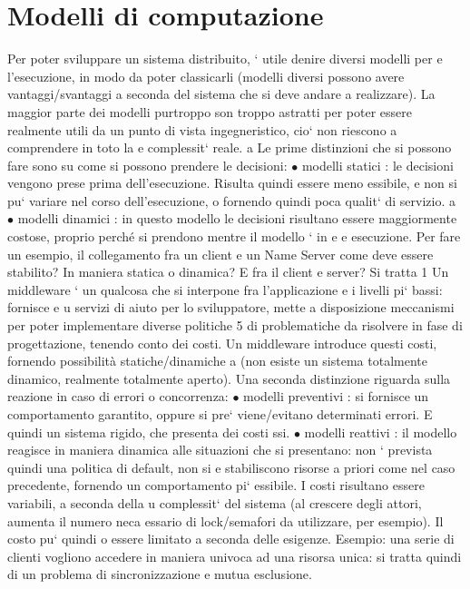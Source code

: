 \documentclass[a4paper,12pt]{article}
\begin{document}
\section{Modelli di computazione}
Per poter sviluppare un sistema distribuito, ` utile denire diversi modelli per
e
l'esecuzione, in modo da poter classicarli (modelli diversi possono avere vantaggi/svantaggi a seconda del sistema che si deve andare a realizzare). La maggior
parte dei modelli purtroppo son troppo astratti per poter essere realmente utili
da un punto di vista ingegneristico, cio` non riescono a comprendere in toto la
e
complessit` reale.
a
Le prime distinzioni che si possono fare sono su come si possono prendere le
decisioni:
$\bullet$ modelli statici : le decisioni vengono prese prima dell'esecuzione. Risulta
quindi essere meno essibile, e non si pu` variare nel corso dell'esecuzione,
o
fornendo quindi poca qualit` di servizio.
a
$\bullet$ modelli dinamici : in questo modello le decisioni risultano essere maggiormente costose, proprio perché si
prendono mentre il modello ` in
e
e
esecuzione.
Per fare un esempio, il collegamento fra un client e un Name Server come deve
essere stabilito? In maniera statica o dinamica? E fra il client e server? Si tratta
1 Un middleware ` un qualcosa che si interpone fra l'applicazione e i livelli pi` bassi: fornisce
e
u
servizi di aiuto per lo sviluppatore, mette a disposizione meccanismi per poter implementare
diverse politiche
5
\newpage
di problematiche da risolvere in fase di progettazione, tenendo conto dei costi.
Un middleware introduce questi costi, fornendo possibilità statiche/dinamiche
a
(non esiste un sistema totalmente dinamico, realmente totalmente aperto).
Una seconda distinzione riguarda sulla reazione in caso di errori o concorrenza:
$\bullet$ modelli preventivi : si fornisce un comportamento garantito, oppure si pre`
viene/evitano determinati errori. E quindi un sistema rigido, che presenta
dei costi ssi.
$\bullet$ modelli reattivi : il modello reagisce in maniera dinamica alle situazioni
che si presentano: non ` prevista quindi una politica di default, non si
e
stabiliscono risorse a priori come nel caso precedente, fornendo un comportamento pi` essibile. I costi risultano essere
variabili, a seconda della
u
complessit` del sistema (al crescere degli attori, aumenta il numero neca
essario di lock/semafori da utilizzare, per esempio). Il costo pu` quindi
o
essere limitato a seconda delle esigenze.
Esempio: una serie di clienti vogliono accedere in maniera univoca ad una risorsa unica: si tratta quindi di un problema
di sincronizzazione e mutua esclusione.
\end{document}
